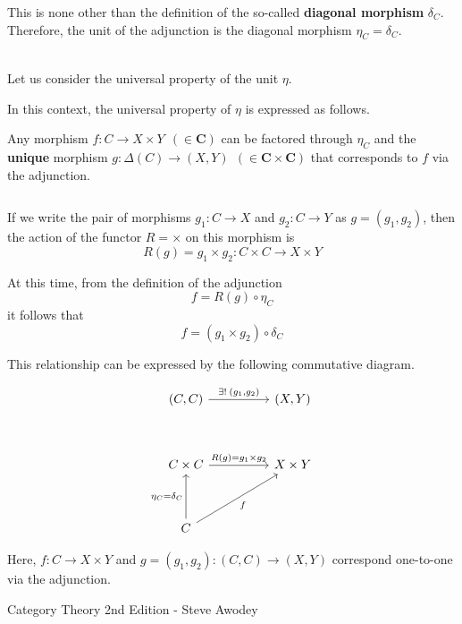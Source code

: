 \documentclass[uplatex,a4j,12pt,dvipdfmx]{jsarticle}
\begin{document}
This is none other than the definition of the so-called \textbf{diagonal morphism} $\delta_{C}$.
Therefore, the unit of the adjunction is the diagonal morphism $\eta_{C} = \delta_{C}$.

\ \\

Let us consider the universal property of the unit $\eta$.

In this context, the universal property of $\eta$ is expressed as follows.

Any morphism
$f: C \to X \times Y \ \ (\in \mathbf{C})$
can be factored through $\eta_{C}$ and the \textbf{unique} morphism
$g: \Delta(C) \to (X,Y) \ \ (\in \mathbf{C} \times \mathbf{C})$
that corresponds to $f$ via the adjunction.

${}$

If we write the pair of morphisms $g_{1}: C \to X$ and $g_{2}: C \to Y$
as $g=(g_{1},g_{2})$,
then the action of the functor $R=\times$ on this morphism is
$$
	R(g) = g_{1} \times g_{2} : C \times C \to X \times Y
$$

At this time, from the definition of the adjunction
$$
	f = R(g) \circ \eta_{C}
$$
it follows that
$$
	f = (g_{1} \times g_{2}) \circ \delta_{C}
$$

This relationship can be expressed by the following commutative diagram.

\[
	\begin{tikzcd}
		{(C,C)} \arrow[rr, "{\exists ! \ \! (g_{1},g_{2})}"] & & {(X,Y)} \\
		& & \\
		C \times C \arrow[rr, "R(g)=g_{1} \times g_{2}"] & & X \times Y \\
		& & \\
		C \arrow[rruu, "f"'] \arrow[uu, "\eta_{C}=\delta_{C}"] & &
	\end{tikzcd}
\]

Here,
$f : C \to X \times Y$
and
$g=(g_{1},g_{2}): (C,C) \to (X,Y)$
correspond one-to-one via the adjunction.



\begin{thebibliography}{9}
	Category Theory 2nd Edition - Steve Awodey
\end{thebibliography}
\end{document}
